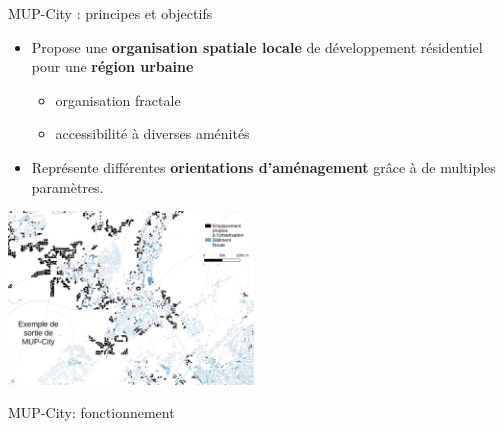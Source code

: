 \documentclass[xcolor=table]{beamer}
\begin{document}
\begin{frame}{MUP-City : principes et objectifs}
	\\
	\begin{itemize}
		\item Propose une \textbf{organisation spatiale locale} de développement résidentiel pour une \textbf{région urbaine}
		\begin{itemize}
			\item<2-> organisation fractale
			\item<3-> accessibilité à diverses aménités %
		\end{itemize}
		\item<4> Représente différentes \textbf{orientations d'aménagement} grâce à de multiples paramètres.
	\end{itemize}
	\includegraphics[width=6.5cm]{Images/ex-sorties-mup.png}
\end{frame}

\begin{frame}{MUP-City: fonctionnement}
	\begin{block}{}\end{block}
\end{frame}
\end{document}
